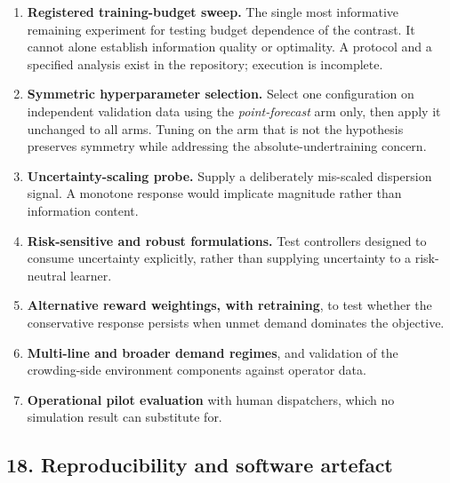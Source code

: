 \documentclass[
]{article}
\providecommand{\tightlist}{%
  \setlength{\itemsep}{0pt}\setlength{\parskip}{0pt}}
\begin{document}
\begin{enumerate}
\def\labelenumi{\arabic{enumi}.}
\tightlist
\item
  \textbf{Registered training-budget sweep.} The single most informative
  remaining experiment for testing budget dependence of the contrast. It
  cannot alone establish information quality or optimality. A protocol
  and a specified analysis exist in the repository; execution is
  incomplete.
\item
  \textbf{Symmetric hyperparameter selection.} Select one configuration
  on independent validation data using the \emph{point-forecast} arm
  only, then apply it unchanged to all arms. Tuning on the arm that is
  not the hypothesis preserves symmetry while addressing the
  absolute-undertraining concern.
\item
  \textbf{Uncertainty-scaling probe.} Supply a deliberately mis-scaled
  dispersion signal. A monotone response would implicate magnitude
  rather than information content.
\item
  \textbf{Risk-sensitive and robust formulations.} Test controllers
  designed to consume uncertainty explicitly, rather than supplying
  uncertainty to a risk-neutral learner.
\item
  \textbf{Alternative reward weightings, with retraining}, to test
  whether the conservative response persists when unmet demand dominates
  the objective.
\item
  \textbf{Multi-line and broader demand regimes}, and validation of the
  crowding-side environment components against operator data.
\item
  \textbf{Operational pilot evaluation} with human dispatchers, which no
  simulation result can substitute for.
\end{enumerate}

\subsection{18. Reproducibility and software
artefact}\label{18-reproducibility-and-software-artefact}
\end{document}
